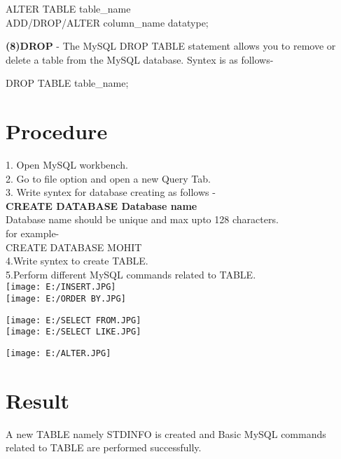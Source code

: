 \documentclass[100pt]{article}
\begin{document}
             \begin{center}
             	 ALTER TABLE table_name\\
                 ADD/DROP/ALTER column_name datatype;\\
             \end{center}
              
    \textbf{(8)DROP} - The MySQL DROP TABLE statement allows you to remove or delete a table from the MySQL database. Syntex is as follows-\\
    
            \begin{center}
            	  DROP TABLE table_name;
            \end{center}
    
    
    	\section{Procedure}
    	1. Open MySQL workbench.\\
    	2. Go to file option and open a new Query Tab.\\
    	3. Write syntex for database creating as follows - \\
    	
    	\textbf{ CREATE DATABASE Database name }\\
    	
    	Database name should be unique and max upto 128 characters.\\
    	for example-\\
    	CREATE DATABASE MOHIT\\
    	4.Write syntex to create TABLE.\\
    	5.Perform different MySQL commands related to TABLE.\\
    	
    
    		    \texttt{[image: E:/INSERT.JPG]}\\
    	
    	
              	\texttt{[image: E:/ORDER BY.JPG]}\\
    	
    	\begin{flushleft}
    		
    
    	        \texttt{[image: E:/SELECT FROM.JPG]}\\
    	
    	
    	        \texttt{[image: E:/SELECT LIKE.JPG]}\\
    	
    \end{flushleft}

    	        \texttt{[image: E:/ALTER.JPG]}\\
    
    	
    	
    	\section{Result}
    	A new TABLE namely STDINFO is created and Basic MySQL commands related to TABLE are performed successfully.
\end{document}
